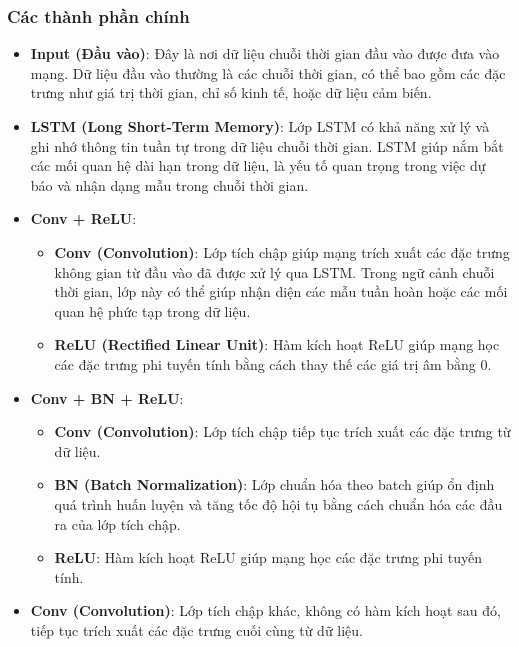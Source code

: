\documentclass[conference]{IEEEtran}
\begin{document}
\subsubsection{Các thành phần chính}
\begin{itemize}
    \item \textbf{Input (Đầu vào)}: Đây là nơi dữ liệu chuỗi thời gian đầu vào được đưa vào mạng. Dữ liệu đầu vào thường là các chuỗi thời gian, có thể bao gồm các đặc trưng như giá trị thời gian, chỉ số kinh tế, hoặc dữ liệu cảm biến.

    \item \textbf{LSTM (Long Short-Term Memory)}: Lớp LSTM có khả năng xử lý và ghi nhớ thông tin tuần tự trong dữ liệu chuỗi thời gian. LSTM giúp nắm bắt các mối quan hệ dài hạn trong dữ liệu, là yếu tố quan trọng trong việc dự báo và nhận dạng mẫu trong chuỗi thời gian.

    \item \textbf{Conv + ReLU}:
          \begin{itemize}
              \item \textbf{Conv (Convolution)}: Lớp tích chập giúp mạng trích xuất các đặc trưng không gian từ đầu vào đã được xử lý qua LSTM. Trong ngữ cảnh chuỗi thời gian, lớp này có thể giúp nhận diện các mẫu tuần hoàn hoặc các mối quan hệ phức tạp trong dữ liệu.
              \item \textbf{ReLU (Rectified Linear Unit)}: Hàm kích hoạt ReLU giúp mạng học các đặc trưng phi tuyến tính bằng cách thay thế các giá trị âm bằng 0.
          \end{itemize}

    \item \textbf{Conv + BN + ReLU}:
          \begin{itemize}
              \item \textbf{Conv (Convolution)}: Lớp tích chập tiếp tục trích xuất các đặc trưng từ dữ liệu.
              \item \textbf{BN (Batch Normalization)}: Lớp chuẩn hóa theo batch giúp ổn định quá trình huấn luyện và tăng tốc độ hội tụ bằng cách chuẩn hóa các đầu ra của lớp tích chập.
              \item \textbf{ReLU}: Hàm kích hoạt ReLU giúp mạng học các đặc trưng phi tuyến tính.
          \end{itemize}

    \item \textbf{Conv (Convolution)}: Lớp tích chập khác, không có hàm kích hoạt sau đó, tiếp tục trích xuất các đặc trưng cuối cùng từ dữ liệu.


\end{itemize}
\end{document}
